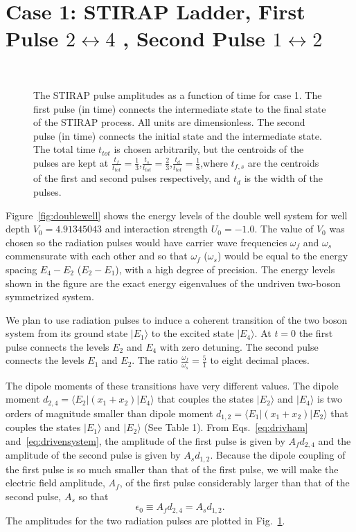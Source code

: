 \section{\label{sec:6} Case 1: STIRAP Ladder, First Pulse $2\leftrightarrow4$ , Second Pulse $1\leftrightarrow2$}
\label{chapter-dblwell:section:stirap}
%
%
\begin{figure}
\vspace*{-0.2in}
\ 

\caption{The STIRAP pulse amplitudes as a function of time for case 1. The first pulse (in time)  connects the intermediate state to the final state of the STIRAP 
process. All units are dimensionless. The second pulse (in time) connects the initial state and the intermediate state. The total time $t_{tot}$ is chosen arbitrarily, 
but the centroids of the pulses are kept at $\frac{t_f}{t_{tot}}=\frac{1}{3}$,$\frac{t_s}{t_{tot}}=\frac{2}{3}$,$\frac{t_d}{t_{tot}}=\frac{1}{8}$,where $t_{f,s}$ are 
the 
centroids of the first and second pulses respectively, and $t_d$ is the width of the pulses.}
\label{fig:stirap}
\end{figure}

Figure~\ref{fig:doublewell} shows the energy levels of the double well system for well depth $V_0=4.91345043$ and interaction strength  $U_0=-1.0$. The value of $V_0$ was chosen so the radiation pulses would have carrier wave frequencies ${\omega}_f$ and ${\omega}_s$ commensurate with each other and  so that  ${\omega}_f$ (${\omega}_s$) would be equal to the energy spacing $E_4-E_2$ ($E_2-E_1$), with a high degree of precision.  The energy levels shown in the figure are the exact energy eigenvalues of the undriven two-boson symmetrized system.  
 
We plan to use radiation pulses to induce a coherent transition of the two boson system from its ground state $|E_1{\rangle}$ to  the excited state $|E_4{\rangle}$. At $t=0$ the first pulse connects the levels $E_2$ and $E_4$ with zero detuning. The second pulse connects the  levels $E_1$ and $E_2$.  The ratio $\frac{\omega_f}{\omega_s}=\frac{5}{1}$ to eight decimal places.

The dipole moments of these transitions have very different values.  The dipole moment 
$d_{2,4}={\langle}E_2|(x_1+x_2)|E_4{\rangle}$ that couples the states $|E_2{\rangle}$ and $|E_4{\rangle}$  is two 
orders of magnitude smaller than dipole moment $d_{1,2}={\langle}E_1|(x_1+x_2)|E_2{\rangle}$ that couples the states 
$|E_1{\rangle}$ and $|E_2{\rangle}$ (See Table 1).  From Eqs.~\eqref{eq:drivham} and~\eqref{eq:drivensystem}, the amplitude 
of the first pulse is given by $A_f d_{2,4}$ and the amplitude of the second pulse is given by $A_s d_{1,2}$. 
Because the dipole coupling of the first pulse is so much smaller than that of the first pulse, we will make the electric field amplitude, $A_f$,  of  the first pulse considerably larger than that of the second pulse, $A_s$  so that 
%
\begin{equation}
{\epsilon}_0{\equiv}A_fd_{2,4}=A_sd_{1,2}.
\label{eq:amps}
\end{equation}
%
The amplitudes for the two radiation pulses are plotted in Fig.~\ref{fig:stirap}. 

